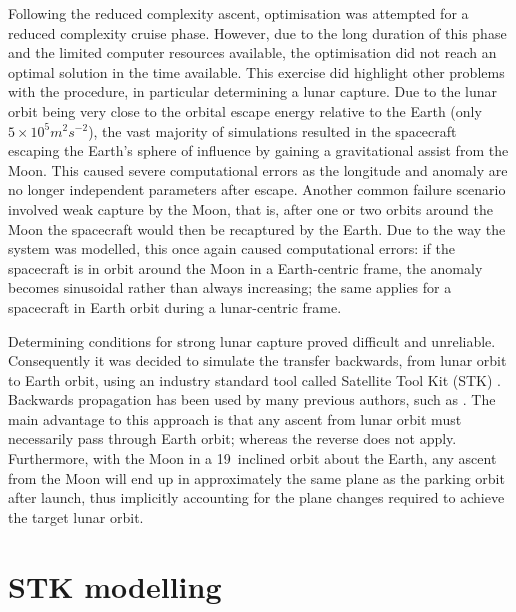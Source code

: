 

Following the reduced complexity ascent, optimisation was attempted for a reduced complexity cruise phase. However, due to the long duration of this phase and the limited computer resources available, the optimisation did not reach an optimal solution in the time available. This exercise did highlight other problems with the procedure, in particular determining a lunar capture. Due to the lunar orbit being very close to the orbital escape energy relative to the Earth (only $5\times10^5 m^2s^{-2}$), the vast majority of simulations resulted in the spacecraft escaping the Earth's sphere of influence by gaining a gravitational assist from the Moon. This caused severe computational errors as the longitude and anomaly are no longer independent parameters after escape. Another common failure scenario involved weak capture by the Moon, that is, after one or two orbits around the Moon the spacecraft would then be recaptured by the Earth. Due to the way the system was modelled, this once again caused computational errors: if the spacecraft is in orbit around the Moon in a Earth-centric frame, the anomaly becomes sinusoidal rather than always increasing; the same applies for a spacecraft in Earth orbit during a lunar-centric frame.

Determining conditions for strong lunar capture proved difficult and unreliable. Consequently it was decided to simulate the transfer backwards, from lunar orbit to Earth orbit, using an industry standard tool called Satellite Tool Kit (STK) \parencite{STK}. Backwards propagation has been used by many previous authors, such as \textcite{Author}. The main advantage to this approach is that any ascent from lunar orbit must necessarily pass through Earth orbit; whereas the reverse does not apply. Furthermore, with the Moon in a 19\degrees\ inclined orbit about the Earth, any ascent from the Moon will end up in approximately the same plane as the parking orbit after launch, thus implicitly accounting for the plane changes required to achieve the target lunar orbit.


\clearpage


\section{STK modelling} \label{sec:STK}

